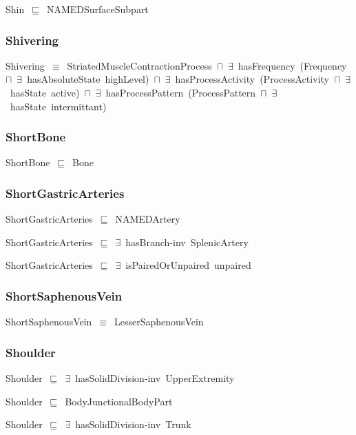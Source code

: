 \documentclass{article}
\begin{document}
Shin~\ensuremath{\sqsubseteq}~NAMEDSurfaceSubpart~

\subsubsection*{Shivering}

Shivering~\ensuremath{\equiv}~StriatedMuscleContractionProcess~\ensuremath{\sqcap}~\ensuremath{\exists}~hasFrequency~(Frequency~\ensuremath{\sqcap}~\ensuremath{\exists}~hasAbsoluteState~highLevel)~\ensuremath{\sqcap}~\ensuremath{\exists}~hasProcessActivity~(ProcessActivity~\ensuremath{\sqcap}~\ensuremath{\exists}~hasState~active)~\ensuremath{\sqcap}~\ensuremath{\exists}~hasProcessPattern~(ProcessPattern~\ensuremath{\sqcap}~\ensuremath{\exists}~hasState~intermittant)

\subsubsection*{ShortBone}

ShortBone~\ensuremath{\sqsubseteq}~Bone~

\subsubsection*{ShortGastricArteries}

ShortGastricArteries~\ensuremath{\sqsubseteq}~NAMEDArtery~

ShortGastricArteries~\ensuremath{\sqsubseteq}~\ensuremath{\exists}~hasBranch-inv~SplenicArtery~

ShortGastricArteries~\ensuremath{\sqsubseteq}~\ensuremath{\exists}~isPairedOrUnpaired~unpaired~

\subsubsection*{ShortSaphenousVein}

ShortSaphenousVein~\ensuremath{\equiv}~LesserSaphenousVein

\subsubsection*{Shoulder}

Shoulder~\ensuremath{\sqsubseteq}~\ensuremath{\exists}~hasSolidDivision-inv~UpperExtremity~

Shoulder~\ensuremath{\sqsubseteq}~BodyJunctionalBodyPart~

Shoulder~\ensuremath{\sqsubseteq}~\ensuremath{\exists}~hasSolidDivision-inv~Trunk~
\end{document}
